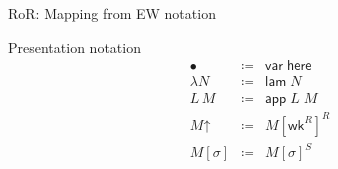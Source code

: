 \documentclass[pdftex,aspectratio=169]{beamer}
\newcommand{\Blob}{\ensuremath{\bullet}}
\newcommand{\Wk}{\ensuremath{\mathord{\uparrow}}}
\begin{document}
\begin{frame}{RoR: Mapping from EW notation}
      \begin{block}{Presentation notation}
        \[
        \begin{array}{rcl}
          \Blob &\coloneqq& \mathsf{var}\;\mathsf{here}\\
          \lambda N &\coloneqq& \mathsf{lam}\;N\\
          L\,M &\coloneqq& \mathsf{app}\;L\;M\\
          M\Wk &\coloneqq& M[\mathsf{wk}^{R}]^{R}\\
          M[\sigma] &\coloneqq& M[\sigma]^{S}
        \end{array}
        \]
      \end{block}
\end{frame}
\end{document}
